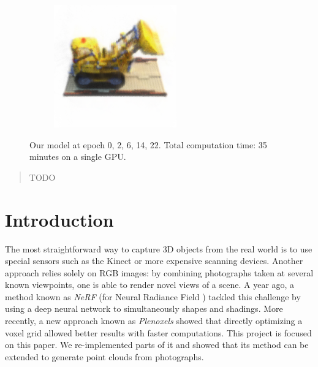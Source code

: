 \documentclass{article}
\begin{document}
\begin{figure}[!h]
\begin{subfigure}{.19\textwidth}
\end{subfigure}
\begin{subfigure}{.19\textwidth}
  \centering
  \includegraphics[width=\linewidth]{figs/model32.png}  
\end{subfigure}
     \caption{Our model at epoch {0, 2, 6, 14, 22}. Total computation time: 35 minutes on a single GPU.}
    \label{fig:lego_optim}
\end{figure}


\begin{abstract}
\lipsum[0-1] TODO
\cite{plenoxels}
\cite{nerf}
\cite{spacecarving}
\cite{directvoxgo}
\cite{instant}
\end{abstract}


\section{Introduction}

The most straightforward way to capture 3D objects from the real world is to use special sensors such as the Kinect or more expensive scanning devices. Another approach relies solely on RGB images: by combining photographs taken at several known viewpoints, one is able to render novel views of a scene. A year ago, a method known as \textit{NeRF} (for Neural Radiance Field \cite{nerf}) tackled this challenge by using a deep neural network to simultaneously shapes and shadings. More recently, a new approach known as \textit{Plenoxels} \cite{plenoxels} showed that directly optimizing a voxel grid allowed better results with faster computations. This project is focused on this paper. We re-implemented parts of it and showed that its method can be extended to generate point clouds from photographs.  
\end{document}
